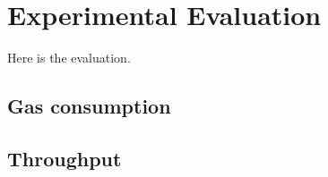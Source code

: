 \chapter{Experimental Evaluation}
\label{chapter:evaluation}

Here is the evaluation.

\section{Gas consumption}

\section{Throughput}
